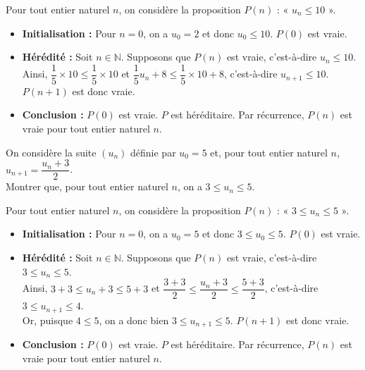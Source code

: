 \documentclass[11pt,fleqn]{book} %
\begin{document}
\begin{solution}Pour tout entier naturel $n$, on considère la proposition $P(n)$ : « $u_n\leqslant 10$ ».
\begin{itemize}
\item \textbf{Initialisation :} Pour $n=0$, on a $u_0=2$ et donc $u_0\leqslant 10$. $P(0)$ est vraie.
\item \textbf{Hérédité :} Soit $n\in\mathbb{N}$. Supposons que $P(n)$ est vraie, c'est-à-dire $u_n\leqslant 10$. Ainsi, $\dfrac{1}{5} \times 10 \leqslant \dfrac{1}{5} \times 10$ et $\dfrac{1}{5}u_n+8 \leqslant \dfrac{1}{5} \times 10 + 8$, c'est-à-dire $u_{n+1}\leqslant10$. $P(n+1)$ est donc vraie.
\item \textbf{Conclusion :} $P(0)$ est vraie. $P$ est héréditaire. Par récurrence, $P(n)$ est vraie pour tout entier naturel $n$.
\end{itemize}\end{solution}

\begin{exercise}
On considère la suite $(u_n)$ définie par $u_0=5$ et, pour tout entier naturel $n$, $u_{n+1}=\dfrac{u_n+3}{2}$. \\ Montrer que, pour tout entier naturel $n$, on a $3 \leqslant u_n \leqslant 5$.\end{exercise}


\begin{solution}Pour tout entier naturel $n$, on considère la proposition $P(n)$ : « $3 \leqslant u_n \leqslant 5$ ».
\begin{itemize}
\item \textbf{Initialisation :} Pour $n=0$, on a $u_0=5$ et donc $3\leqslant u_0\leqslant 5$. $P(0)$ est vraie.
\item \textbf{Hérédité :} Soit $n\in\mathbb{N}$. Supposons que $P(n)$ est vraie, c'est-à-dire $3 \leqslant u_n \leqslant 5$. \\Ainsi, $3+3 \leqslant u_n+3 \leqslant 5+3$ et $\dfrac{3+3}{2} \leqslant \dfrac{u_n+3}{2} \leqslant \dfrac{5+3}{2}$, c'est-à-dire $3 \leqslant u_{n+1} \leqslant 4$.\\ Or, puisque $4 \leqslant 5$, on a donc bien $3\leqslant u_{n+1} \leqslant 5$. $P(n+1)$ est donc vraie.
\item \textbf{Conclusion :} $P(0)$ est vraie. $P$ est héréditaire. Par récurrence, $P(n)$ est vraie pour tout entier naturel $n$.
\end{itemize}\end{solution}
\end{document}
